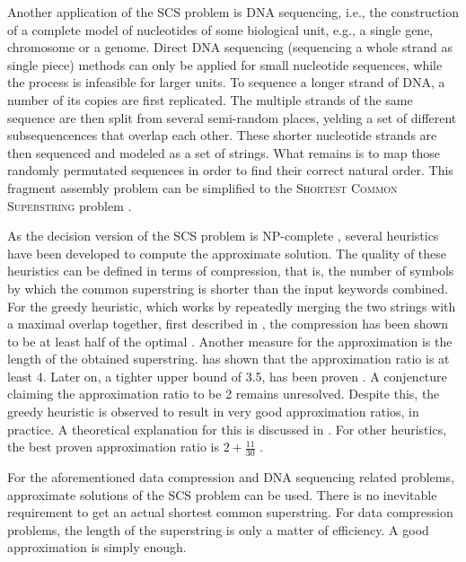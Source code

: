 \documentclass[english,twoside,censored,csm,algorithms-track-2020]{HYthesisML}
\theoremstyle{plain}
\theoremstyle{definition}
\numberwithin{testexample}{chapter}
\begin{document}
Another application of the SCS problem is DNA sequencing, i.e., the construction of a complete
model of nucleotides of some biological unit, e.g., a single gene, chromosome or a genome. 
Direct DNA sequencing (sequencing a whole strand as single piece) methods can only be applied for
small nucleotide sequences,
while the process is infeasible for larger units. To sequence a longer strand of DNA,
a number of its copies are
first replicated. The multiple strands of the same sequence are then split from several semi-random
places, yelding a set of different subsequencences that overlap each other. These shorter nucleotide
strands are then sequenced and modeled as a set of strings. What remains is to map
those randomly permutated sequences in order to find their correct natural order.
This fragment assembly problem can be simplified to the \textsc{Shortest Common Superstring}
problem \citep{Peltola83}.

As the decision version of the SCS problem is \textsc{NP}-complete \citep{Gallant80},
several heuristics have been
developed to compute the approximate solution.
The quality of these heuristics
can be defined in terms of compression, that is, the number of symbols by which the common superstring
is shorter than the input keywords combined. For the greedy heuristic,
which works by repeatedly merging the two strings with a maximal overlap together, first
described in \citep{Gallant82}, the compression has been shown to be at least half of the optimal
\citep{Tarhio88}. Another measure for the approximation is the length of the
obtained superstring. \cite{Blum94} has shown that the approximation ratio is at least 4.
Later on, a tighter upper bound of 3.5, has been proven \citep{Kaplan05}.
A conjencture \citep{Tarhio88} claiming the approximation ratio to be 2 remains unresolved.
Despite this,
the greedy heuristic is observed to result in very good approximation
ratios, in practice. A theoretical explanation for this is discussed in \citep{Ma08}.
For other heuristics,
the best proven approximation ratio is $2 + \frac{11}{30}$ \citep{Paluch14}.

For the aforementioned data compression and DNA sequencing related problems,
approximate solutions of the SCS problem can be used. There is no inevitable requirement
to get an actual shortest common superstring. For data compression problems, the length of
the superstring is only a matter of efficiency. A good approximation is simply enough. 
\end{document}
